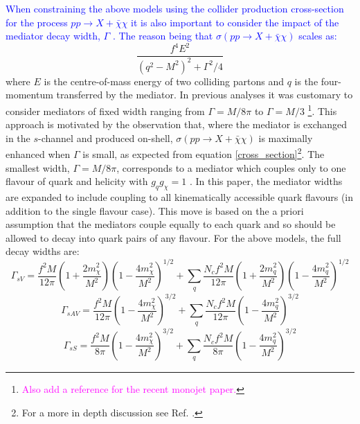 \begin{flushleft}
\hspace{1cm}\textcolor{blue}{When constraining the above models using the collider production cross-section for the process $pp \rightarrow X + \bar{\chi}\chi$ it is also important to consider the impact of the mediator decay width, $\Gamma$ \cite{}. The reason being that $\sigma\left(pp \rightarrow X + \bar{\chi}\chi\right)$ scales as:}
\begin{equation}
\label{cross_section}
\frac{f^{4}E^{2}}{(q^{2} - M^{2})^{2} + \Gamma^{2}/4}
\end{equation}
where $E$ is the centre-of-mass energy of two colliding partons and $q$ is the four-momentum transferred by the mediator. In previous analyses it was customary to consider mediators of fixed width ranging from $\Gamma = M/8\pi$ to $\Gamma = M/3$ \cite{METSig, Fox:2012ee} \footnote{\textcolor{magenta}{Also add a reference for the recent monojet paper.}}. This approach is motivated by the observation that, where the mediator is exchanged in the $s$-channel and produced on-shell, $\sigma\left(pp \rightarrow X + \bar{\chi}\chi\right)$ is maximally enhanced when $\Gamma$ is small, as expected from equation \ref{cross_section}\footnote{For a more in depth discussion see Ref. \cite{METSig}.}. The smallest width, $\Gamma = M/8\pi$, corresponds to a mediator which couples only to one flavour of quark and helicity with $g_{q}g_{\chi} = 1$ \cite{METSig}. In this paper, the mediator widths are expanded to include coupling to all kinematically accessible quark flavours (in addition to the single flavour case). This move is based on the a priori assumption that the mediators couple equally to each quark and so should be allowed to decay into quark pairs of any flavour. For the above models, the full decay widths are:
\begin{equation}
\label{gamma_sV}
\Gamma_{sV} = \frac{f^{2} M}{12\pi}\left(1 + \frac{2m_{\chi}^{2}}{M^{2}}\right)\left(1 - \frac{4m_{\chi}^{2}}{M^{2}}\right)^{1/2} + \sum_{\substack{q}}\frac{N_{c}f^{2}M}{12\pi}\left(1 + \frac{2m_{q}^{2}}{M^{2}}\right)\left(1 - \frac{4m_{q}^{2}}{M^{2}}\right)^{1/2}
\end{equation}
\begin{equation}
\label{gamma_sAV}
\Gamma_{sAV} = \frac{f^{2} M}{12\pi}\left(1 - \frac{4m_{\chi}^{2}}{M^{2}}\right)^{3/2} + \sum_{\substack{q}}\frac{N_{c}f^{2} M}{12\pi}\left(1 - \frac{4m_{q}^{2}}{M^{2}}\right)^{3/2}
\end{equation}
\begin{equation}
\label{gamma_sS}
\Gamma_{sS} = \frac{f^{2} M}{8\pi}\left(1 - \frac{4m_{\chi}^{2}}{M^{2}}\right)^{3/2} + \sum_{\substack{q}}\frac{N_{c}f^{2} M}{8\pi}\left(1 - \frac{4m_{q}^{2}}{M^{2}}\right)^{3/2}

\end{equation}
\end{flushleft}

